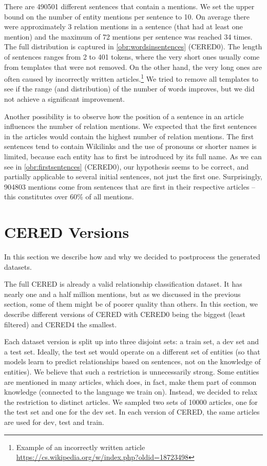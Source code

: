 There are \num{490501} different sentences that contain a mentions. We set the upper bound on the number of entity mentions per sentence to 10. On average there were approximately 3 relation mentions in a sentence (that had at least one mention) and the maximum of 72 mentions per sentence was reached 34 times. The full distribution is captured in \autoref{obr:wordsinsentences} (CERED0). The length of sentences ranges from 2 to 401 tokens, where the very short ones usually come from templates that were not removed. On the other hand, the very long ones are often caused by incorrectly written articles.\footnote{Example of an incorrectly written article \url{https://cs.wikipedia.org/w/index.php?oldid=18723498}} We tried to remove all templates to see if the range (and distribution) of the number of words improves, but we did not achieve a significant improvement.




Another possibility is to observe how the position of a sentence in an article influences the number of relation mentions. We expected that the first sentences in the articles would contain the highest number of relation mentions. The first sentences tend to contain Wikilinks and the use of pronouns or shorter names is limited, because each entity has to first be introduced by its full name. As we can see in \autoref{obr:firstsentences} (CERED0), our hypothesis seems to be correct, and partially applicable to several initial sentences, not just the first one. Surprisingly, \num{904803} mentions come from sentences that are first in their respective articles -- this constitutes over 60\% of all mentions.





\section{CERED Versions}
In this section we describe how and why we decided to postprocess the generated datasets. 

The full CERED is already a valid relationship classification dataset. It has nearly one and a half million mentions, but as we discussed in the previous section, some of them might be of poorer quality than others. In this section, we describe different versions of CERED with CERED0 being the biggest (least filtered) and CERED4 the smallest. 


Each dataset version is split up into three disjoint sets: a train set, a dev set and a test set. Ideally, the test set would operate on a different set of entities (so that models learn to predict relationships based on sentences, not on the knowledge of entities). We believe that such a restriction is unnecessarily strong. Some entities are mentioned in many articles, which does, in fact, make them part of common knowledge (connected to the language we train on). Instead, we decided to relax the restriction to distinct articles. We sampled two sets of \num{10000} articles, one for the test set and one for the dev set. In each version of CERED, the same articles are used for dev, test and train.

